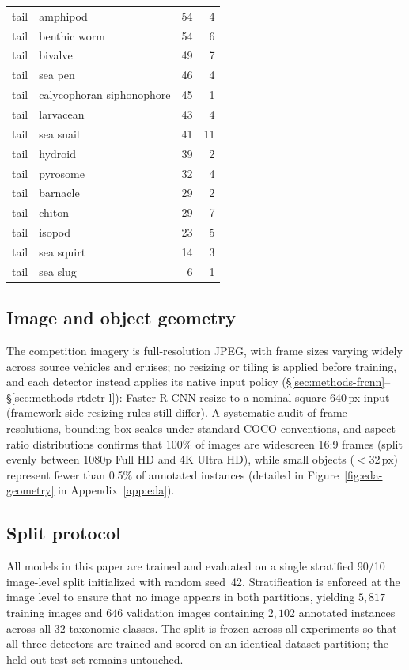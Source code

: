 \documentclass[11pt,a4paper,twocolumn]{article}
\begin{document}
\begin{table}[t]
\begin{tabular}{llrr}
    tail & amphipod & 54 & 4 \\
    tail & benthic worm & 54 & 6 \\
    tail & bivalve & 49 & 7 \\
    tail & sea pen & 46 & 4 \\
    tail & calycophoran siphonophore & 45 & 1 \\
    tail & larvacean & 43 & 4 \\
    tail & sea snail & 41 & 11 \\
    tail & hydroid & 39 & 2 \\
    tail & pyrosome & 32 & 4 \\
    tail & barnacle & 29 & 2 \\
    tail & chiton & 29 & 7 \\
    tail & isopod & 23 & 5 \\
    tail & sea squirt & 14 & 3 \\
    tail & sea slug & 6 & 1 \\
    \bottomrule
  \end{tabular}
\end{table}

\subsection{Image and object geometry}
\label{sec:data-geometry}

The competition imagery is full-resolution JPEG, with frame sizes varying
widely across source vehicles and cruises; no resizing or tiling is applied
before training, and each detector instead applies its native input policy
(\S\ref{sec:methods-frcnn}--\S\ref{sec:methods-rtdetr-l}): Faster R-CNN
resize to a nominal square 640\,px input (framework-side resizing rules still differ).
A systematic audit of frame resolutions, bounding-box scales under standard COCO conventions, and aspect-ratio distributions confirms that 100\% of images are widescreen 16:9 frames (split evenly between 1080p Full HD and 4K Ultra HD), while small objects ($<32$\,px) represent fewer than 0.5\% of annotated instances (detailed in Figure~\ref{fig:eda-geometry} in Appendix~\ref{app:eda}).

\subsection{Split protocol}
\label{sec:data-split}

All models in this paper are trained and evaluated on a single stratified
90/10 image-level split initialized with random seed~42. Stratification is
enforced at the image level to ensure that no image appears in both partitions,
yielding $5{,}817$ training images and $646$ validation images containing
$2{,}102$ annotated instances across all $32$ taxonomic classes. The split is
frozen across all experiments so that all three detectors are trained and scored
on an identical dataset partition; the held-out test set remains untouched.
\end{document}
